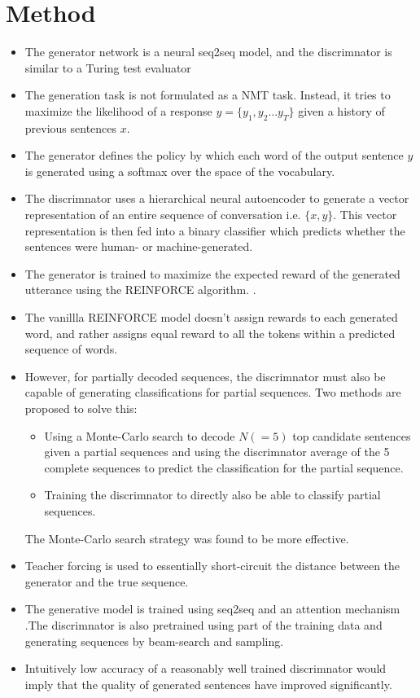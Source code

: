 \documentclass[12pt]{scrartcl}
\begin{document}
\section{Method}
  \begin{itemize}
    \item The generator network is a neural seq2seq model, and the discrimnator is similar to a Turing test evaluator
    \item The generation task is not formulated as a NMT task. Instead, it tries to maximize the likelihood of a response $y = \{y_1, y_2 ... y_T\}$ given a history of previous sentences $x$.
    \item The generator defines the policy by which each word of the output sentence $y$ is generated using a softmax over the space of the vocabulary.
    \item The discrimnator uses a hierarchical neural autoencoder \cite{li2015hierarchical} to generate a vector representation of an entire sequence of conversation i.e. $\{x, y\}$. This vector representation is then fed into a binary classifier which predicts whether the sentences were human- or machine-generated.
    \item The generator is trained to maximize the expected reward of the generated utterance using the REINFORCE algorithm. \cite{williams1992simple}.
    \item The vanillla REINFORCE model doesn't assign rewards to each generated word, and rather assigns equal reward to all the tokens within a predicted sequence of words.
    \item However, for partially decoded sequences, the discrimnator must also be capable of generating classifications for partial sequences. Two methods are proposed to solve this:
      \begin{itemize}
        \item Using a Monte-Carlo search to decode $N ( = 5)$ top candidate sentences given a partial sequences and using the discrimnator average of the 5 complete sequences to predict the classification for the partial sequence.
        \item Training the discrimnator to directly also be able to classify partial sequences.
      \end{itemize}
    The Monte-Carlo search strategy was found to be more effective.
    \item Teacher forcing is used to essentially short-circuit the distance between the generator and the true sequence.
    \item The generative model is trained using seq2seq \cite{sutskever2014sequence} and an attention mechanism \cite{bahdanau2014neural}.The discrimnator is also pretrained using part of the training data and generating sequences by beam-search and sampling.
    \item Intuitively low accuracy of a reasonably well trained discrimnator would imply that the quality of generated sentences have improved significantly.
  \end{itemize}
\end{document}
